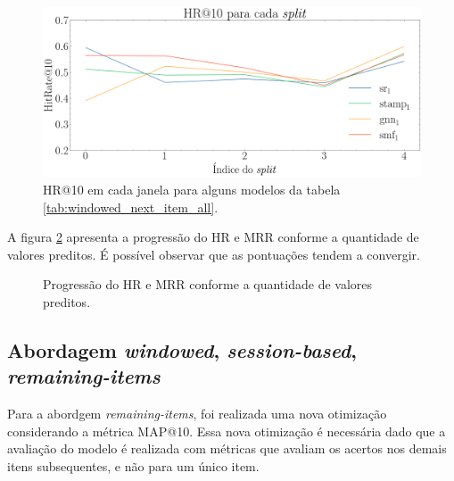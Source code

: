 \begin{figure}[htbp]
  \centering
  \includegraphics[width=1\textwidth]{chapters/chap04/images/hr10_splits.png}
  \caption{HR@10 em cada janela para alguns modelos da tabela
  \ref{tab:windowed_next_item_all}.}
  \label{fig:next-item-single}
\end{figure}


A figura \ref{fig:progressao} apresenta a progressão do HR e MRR conforme a
quantidade de valores preditos. É possível observar que as pontuações tendem
a convergir.
\newpage

\begin{figure}[htbp]
  \hfill
  \hfill
  \hfill
  \caption{Progressão do HR e MRR conforme a quantidade de valores preditos.}
  \label{fig:progressao}
  \end{figure}

\subsection{Abordagem \textit{windowed}, \textit{session-based}, \textit{remaining-items}}
Para a abordgem \textit{remaining-items}, foi realizada uma nova otimização
considerando a métrica MAP@10. Essa nova otimização é necessária dado que a
avaliação do modelo é realizada com métricas que avaliam os acertos nos demais
itens subsequentes, e não para um único item.

